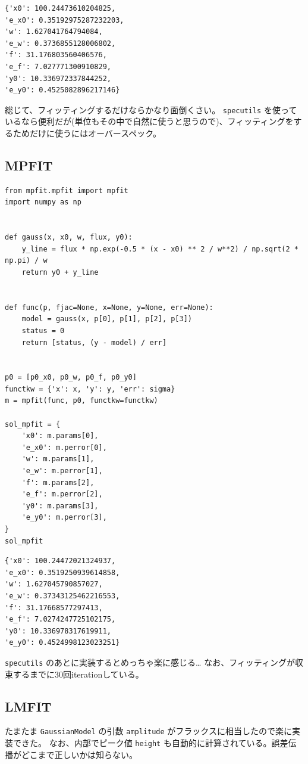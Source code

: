\documentclass[a4paper, 8pt, notitlepage, uplatex, dvipdfmx]{jsarticle}
\begin{document}
\label{}
\begin{verbatim}
{'x0': 100.24473610204825,
'e_x0': 0.35192975287232203,
'w': 1.627041764794084,
'e_w': 0.3736855128006802,
'f': 31.176803560406576,
'e_f': 7.027771300910829,
'y0': 10.336972337844252,
'e_y0': 0.4525082896217146}
\end{verbatim}

総じて、フィッティングするだけならかなり面倒くさい。
\texttt{specutils} を使っているなら便利だが(単位もその中で自然に使うと思うので)、フィッティングをするためだけに使うにはオーバースペック。
\subsection{MPFIT}
\label{sec:org012f194}
\begin{verbatim}
from mpfit.mpfit import mpfit
import numpy as np


def gauss(x, x0, w, flux, y0):
    y_line = flux * np.exp(-0.5 * (x - x0) ** 2 / w**2) / np.sqrt(2 * np.pi) / w
    return y0 + y_line


def func(p, fjac=None, x=None, y=None, err=None):
    model = gauss(x, p[0], p[1], p[2], p[3])
    status = 0
    return [status, (y - model) / err]


p0 = [p0_x0, p0_w, p0_f, p0_y0]
functkw = {'x': x, 'y': y, 'err': sigma}
m = mpfit(func, p0, functkw=functkw)

sol_mpfit = {
    'x0': m.params[0],
    'e_x0': m.perror[0],
    'w': m.params[1],
    'e_w': m.perror[1],
    'f': m.params[2],
    'e_f': m.perror[2],
    'y0': m.params[3],
    'e_y0': m.perror[3],
}
sol_mpfit
\end{verbatim}

\label{}
\begin{verbatim}
{'x0': 100.24472021324937,
'e_x0': 0.3519250939614858,
'w': 1.627045790857027,
'e_w': 0.37343125462216553,
'f': 31.17668577297413,
'e_f': 7.0274247725102175,
'y0': 10.336978317619911,
'e_y0': 0.4524998123023251}
\end{verbatim}

\texttt{specutils} のあとに実装するとめっちゃ楽に感じる\ldots{}
なお、フィッティングが収束するまでに30回iterationしている。
\subsection{LMFIT}
\label{sec:org21e5dd8}
たまたま \texttt{GaussianModel} の引数 \texttt{amplitude} がフラックスに相当したので楽に実装できた。
なお、内部でピーク値 \texttt{height} も自動的に計算されている。誤差伝播がどこまで正しいかは知らない。
\end{document}
